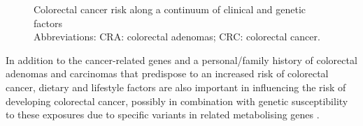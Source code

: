 \begin{figure} 
\caption{Colorectal cancer risk along a continuum of clinical and genetic factors \\ Abbreviations: CRA: colorectal adenomas; CRC: colorectal cancer.} 
\label{figure1_1} 
\end{figure} 
 
\noindent In addition to the cancer-related genes and a personal/family history of colorectal adenomas and carcinomas that predispose to an increased risk of colorectal cancer, dietary and lifestyle factors are also important in influencing the risk of developing colorectal cancer, possibly in combination with genetic susceptibility to these exposures due to specific variants in related metabolising genes \cite{c126,c127}. 
 

